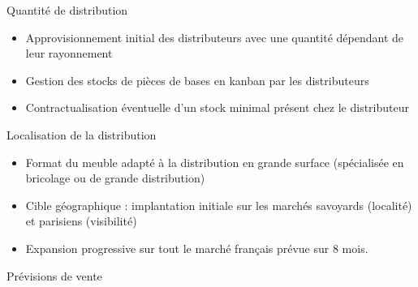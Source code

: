 \begin{frame}{Quantité de distribution}
\begin{itemize}
\item<1-> Approvisionnement initial des distributeurs avec une quantité dépendant de leur rayonnement
\item<2-> Gestion des stocks de pièces de bases en kanban par les distributeurs
\item<3-> Contractualisation éventuelle d'un stock minimal présent chez le distributeur
\end{itemize}
\end{frame}

\begin{frame}{Localisation de la distribution}
	\begin{itemize}
		\item<1-> Format du meuble adapté à la distribution en grande surface (spécialisée en bricolage ou de grande distribution)
		\item<2-> Cible géographique : implantation initiale sur les marchés savoyards (localité) et parisiens (visibilité)
		\item<3-> Expansion progressive sur tout le marché français prévue sur 8 mois.
	\end{itemize}
\end{frame}

\begin{frame}{Prévisions de vente}
\end{frame}